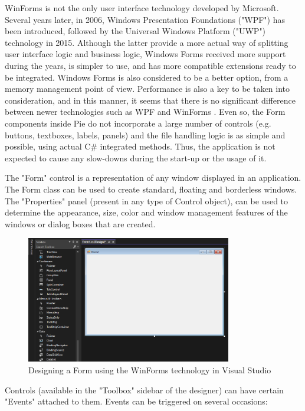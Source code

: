 WinForms is not the only user interface technology developed by Microsoft. Several years later, in 2006, Windows Presentation Foundations ("WPF") has been introduced, followed by the Universal Windows Platform ("UWP") technology in 2015. Although the latter provide a more actual way of splitting user interface logic and business logic, Windows Forms received more support during the years, is simpler to use, and has more compatible extensions ready to be integrated. Windows Forms is also considered to be a better option, from a memory management point of view. Performance is also a key to be taken into consideration, and in this manner, it seems that there is no significant difference between newer technologies such as WPF and WinForms \cite{han2023optimization}. Even so, the Form components inside Pie do not incorporate a large number of controls (e.g. buttons, textboxes, labels, panels) and the file handling logic is as simple and possible, using actual C\# integrated methods. Thus, the application is not expected to cause any slow-downs during the start-up or the usage of it.

The "Form" control is a representation of any window displayed in an application. The Form class can be used to create standard, floating and borderless windows. The "Properties" panel (present in any type of Control object), can be used to determine the appearance, size, color and window management features of the windows or dialog boxes that are created. \cite{form-class}

\begin{figure}[H]
\centering
\includegraphics[width=0.8\textwidth]{images/winforms-designer.png}
\caption{Designing a Form using the WinForms technology in Visual Studio}
\label{fig:fig2,1.}
\end{figure}

Controls (available in the "Toolbox" sidebar of the designer) can have certain "Events" attached to them. Events can be triggered on several occasions:

